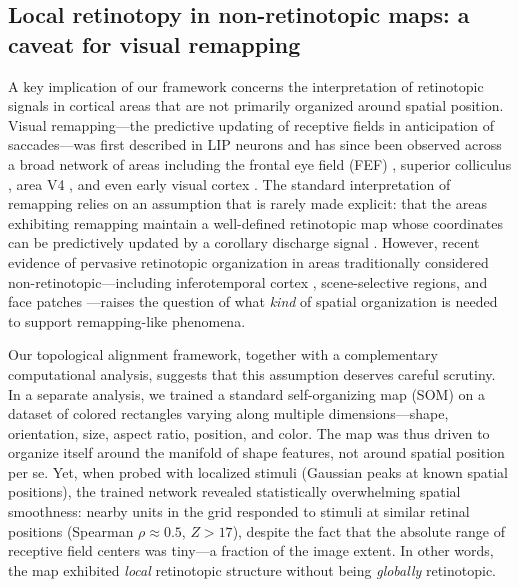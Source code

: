 
\subsection{Local retinotopy in non-retinotopic maps: a caveat for visual remapping}

A key implication of our framework concerns the interpretation of retinotopic
signals in cortical areas that are not primarily organized around spatial position.
Visual remapping---the predictive updating of receptive fields in anticipation of
saccades---was first described in LIP neurons \citep{duhamel1992} and has since been
observed across a broad network of areas including the frontal eye field (FEF)
\citep{umeno1997}, superior colliculus \citep{walker1995}, area V4
\citep{neupane2016}, and even early visual cortex \citep{nakamura2002}. The standard
interpretation of remapping relies on an assumption that is rarely made explicit:
that the areas exhibiting remapping maintain a well-defined retinotopic map whose
coordinates can be predictively updated by a corollary discharge signal
\citep{sommer2006, marino2021}. However, recent evidence of pervasive retinotopic
organization in areas traditionally considered non-retinotopic---including
inferotemporal cortex \citep{arcaro2017}, scene-selective regions, and face patches
\citep{arcaro2017}---raises the question of what \emph{kind} of spatial organization
is needed to support remapping-like phenomena.

Our topological alignment framework, together with a complementary computational
analysis, suggests that this assumption deserves careful scrutiny. In a separate
analysis, we trained a standard self-organizing map (SOM) on a dataset of colored
rectangles varying along multiple dimensions---shape, orientation, size, aspect
ratio, position, and color. The map was thus driven to organize itself around the
manifold of shape features, not around spatial position per se. Yet, when probed
with localized stimuli (Gaussian peaks at known spatial positions), the trained
network revealed statistically overwhelming spatial smoothness: nearby units in the
grid responded to stimuli at similar retinal positions (Spearman $\rho \approx 0.5$,
$Z > 17$), despite the fact that the absolute range of receptive field centers was
tiny---a fraction of the image extent. In other words, the map exhibited
\emph{local} retinotopic structure without being \emph{globally} retinotopic.


